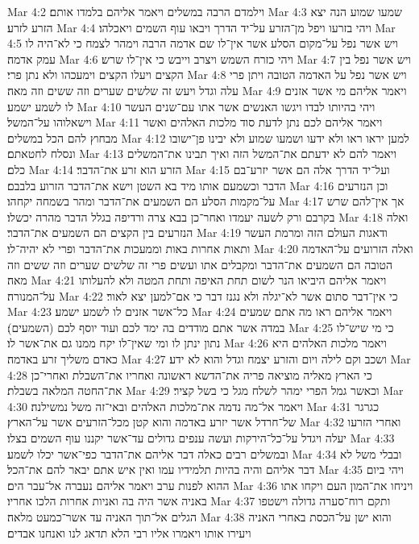 Mar 4:2  וילמדם הרבה במשלים ויאמר אליהם בלמדו אותם׃
Mar 4:3  שמעו שמוע הנה יצא הזרע לזרע׃
Mar 4:4  ויהי בזרעו ויפל מן־הזרע על־יד הדרך ויבאו עוף השמים ויאכלהו׃
Mar 4:5  ויש אשר נפל על־מקום הסלע אשר אין־לו שם אדמה הרבה וימהר לצמח כי לא־היה לו עמק אדמה׃
Mar 4:6  ויהי כזרח השמש ויצרב וייבש כי אין־לו שרש׃
Mar 4:7  ויש אשר נפל בין הקצים ויעלו הקצים וימעכהו ולא נתן פרי׃
Mar 4:8  ויש אשר נפל על האדמה הטובה ויתן פרי עלה וגדל ויעש זה שלשים שערים וזה ששים וזה מאה׃
Mar 4:9  ויאמר אליהם מי אשר אזנים לו לשמע ישמע׃
Mar 4:10  ויהי בהיותו לבדו ויגשו האנשים אשר אתו עם־שנים העשר וישאלוהו על־המשל׃
Mar 4:11  ויאמר אליהם לכם נתן לדעת סוד מלכות האלהים ואשר מבחוץ להם הכל במשלים׃
Mar 4:12  למען יראו ראו ולא ידעו ושמעו שמוע ולא יבינו פן־ישובו ונסלח לחטאתם׃
Mar 4:13  ויאמר להם לא ידעתם את־המשל הזה ואיך תבינו את־המשלים כלם׃
Mar 4:14  הזרע הוא זרע את־הדבר׃
Mar 4:15  ועל־יד הדרך אלה הם אשר יזרע־בם הדבר וכשמעם אותו מיד בא השטן וישא את־הדבר הזרוע בלבבם׃
Mar 4:16  וכן הנזרעים על־מקמות הסלע הם השמעים את־הדבר ומהר בשמחה יקחהו׃
Mar 4:17  אך אין־להם שרש בקרבם ורק לשעה יעמדו ואחר־כן בבא צרה ורדיפה בגלל הדבר מהרה יכשלו׃
Mar 4:18  ואלה הנזרעים בין הקצים הם השמעים את־הדבר׃
Mar 4:19  ודאגות העולם הזה ומרמת העשר ותאות אחרות באות וממעכות את־הדבר ופרי לא יהיה־לו׃
Mar 4:20  ואלה הזרועים על־האדמה הטובה הם השמעים את־הדבר ומקבלים אתו ועשים פרי זה שלשים שערים וזה ששים וזה מאה׃
Mar 4:21  ויאמר אליהם היביאו הנר לשום תחת האיפה ותחת המטה ולא להעלותו על־המנורה׃
Mar 4:22  כי אין־דבר סתום אשר לא־יגלה ולא נגנז דבר כי אם־למען יצא לאור׃
Mar 4:23  כל־אשר אזנים לו לשמע ישמע׃
Mar 4:24  ויאמר אליהם ראו מה אתם שמעים במדה אשר אתם מודדים בה ימד לכם ועוד יוסף לכם (השמעים)׃
Mar 4:25  כי מי שיש־לו נתון ינתן לו ומי שאין־לו יקח ממנו גם את־אשר לו׃
Mar 4:26  ויאמר מלכות האלהים היא כאדם משליך זרע באדמה׃
Mar 4:27  ושכב וקם לילה ויום והזרע יצמח וגדל והוא לא ידע׃
Mar 4:28  כי הארץ מאליה מוציאה פריה את־הדשא ראשונה ואחריו את־השבלת ואחרי־כן את־החטה המלאה בשבלת׃
Mar 4:29  וכאשר גמל הפרי ימהר לשלח מגל כי בשל קציר׃
Mar 4:30  ויאמר אל־מה נדמה את־מלכות האלהים ובאי־זה משל נמשילנה׃
Mar 4:31  כגרגר של־חרדל אשר יזרע באדמה והוא קטן מכל־הזרעים אשר על־הארץ׃
Mar 4:32  ואחרי הזרעו יעלה ויגדל על־כל־הירקות ועשה ענפים גדולים עד־אשר יקננו עוף השמים בצלו׃
Mar 4:33  ובמשלים רבים כאלה דבר אליהם את־הדבר כפי־אשר יכלו לשמע׃
Mar 4:34  ובבלי משל לא דבר אליהם והיה בהיות תלמידיו עמו ואין איש אתם יבאר להם את־הכל׃
Mar 4:35  ויהי ביום ההוא לפנות ערב ויאמר אליהם נעברה אל־עבר הים׃
Mar 4:36  ויניחו את־המון העם ויקחו אתו באניה אשר היה בה ואניות אחרות הלכו אחריו׃
Mar 4:37  ותקם רוח־סערה גדולה וישטפו הגלים אל־תוך האניה עד אשר־כמעט מלאה׃
Mar 4:38  והוא ישן על־הכסת באחרי האניה ויעירו אותו ויאמרו אליו רבי הלא תדאג לנו ואנחנו אבדים׃
